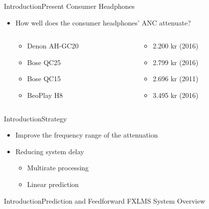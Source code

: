 \begin{frame}{Introduction}{Present Consumer Headphones}
	\begin{itemize}	
	\item How well does the consumer headphones' ANC attenuate?
	\begin{columns}
		\begin{column}{0.27\textwidth}
		\begin{itemize}
			\item Denon AH-GC20
			\item Bose QC25 
			\item Bose QC15 	
			\item BeoPlay H8 	
		\end{itemize}
		\end{column}
		\begin{column}{0.6\textwidth} 
		\begin{itemize}
			\item[] 2.200 kr (2016)
			\item[] 2.799 kr (2016)
			\item[] 2.696 kr (2011)
			\item[] 3.495 kr (2016)
		\end{itemize}
		\end{column}
	\end{columns}
	\end{itemize}			
	\begin{center}
		
	\end{center}	
\end{frame}


\begin{frame}{Introduction}{Strategy}
	\begin{center}
	\begin{itemize}
		\item Improve the frequency range of the attenuation
		\item Reducing system delay
		\begin{itemize}	
		\item Multirate processing
		\item Linear prediction
		\end{itemize}				
	\end{itemize}
	\end{center}
\end{frame}

\begin{frame}{Introduction}{Prediction and Feedforward FXLMS System Overview}
	\begin{center}
		\resizebox{0.85\columnwidth}{!}{	
		
		}	
	\end{center}
\end{frame}
